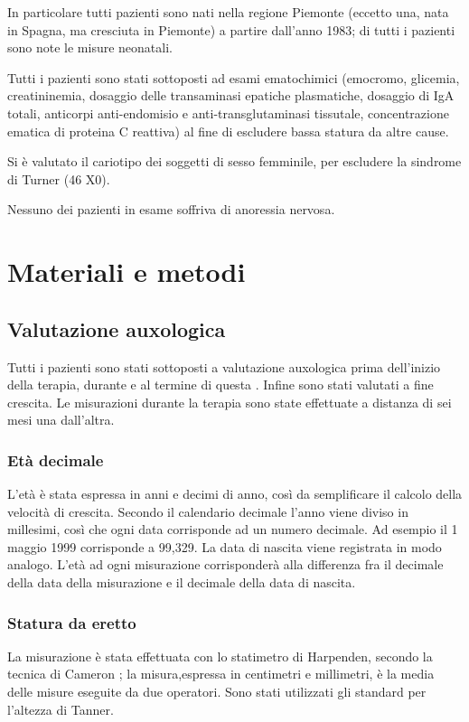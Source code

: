 In particolare tutti pazienti sono nati nella regione Piemonte (eccetto una, nata in Spagna, ma cresciuta in Piemonte) a partire dall'anno 1983; di tutti i pazienti sono note le misure neonatali.

Tutti i pazienti sono stati sottoposti ad esami ematochimici (emocromo, glicemia, creatininemia, dosaggio delle transaminasi epatiche plasmatiche, dosaggio di IgA totali, anticorpi anti-endomisio e anti-transglutaminasi tissutale, concentrazione ematica di proteina C reattiva) al fine di escludere bassa statura da altre cause. 

Si è valutato il cariotipo dei soggetti di sesso femminile, per escludere la sindrome di Turner (46 X0). 

Nessuno dei pazienti in esame soffriva di anoressia nervosa.


\section{Materiali e metodi}

\subsection{Valutazione auxologica}
Tutti i pazienti sono stati sottoposti a valutazione auxologica prima dell'inizio della terapia, durante e al termine di questa . Infine sono stati valutati a fine crescita. Le misurazioni durante la terapia sono state effettuate a distanza di sei mesi una dall'altra.

\subsubsection*{Età decimale}
L'età è stata espressa in anni e decimi di anno, così da semplificare il calcolo della velocità di crescita. Secondo il calendario decimale l'anno viene diviso in millesimi, così che ogni data corrisponde ad un numero decimale. Ad esempio il 1 maggio 1999 corrisponde a 99,329. La data di nascita viene registrata in modo analogo. L'età ad ogni misurazione corrisponderà alla differenza fra il decimale della data della misurazione e il decimale della data di nascita. %


\subsubsection*{Statura da eretto}
 La misurazione è stata effettuata con lo statimetro di Harpenden, secondo la tecnica di Cameron%
; la misura,espressa in centimetri e millimetri, è la media delle misure eseguite da due operatori. Sono stati utilizzati gli standard per l'altezza di Tanner.%

